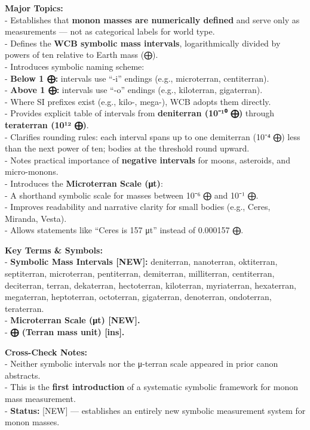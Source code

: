 \documentclass[
  letterpaper,
]{book}
\begin{document}
\textbf{Major Topics:}\\
- Establishes that \textbf{monon masses are numerically defined} and
serve only as measurements --- not as categorical labels for world
type.\\
- Defines the \textbf{WCB symbolic mass intervals}, logarithmically
divided by powers of ten relative to Earth mass (⨁).\\
- Introduces symbolic naming scheme:\\
- \textbf{Below 1 ⨁:} intervals use ``-i'' endings (e.g., microterran,
centiterran).\\
- \textbf{Above 1 ⨁:} intervals use ``-o'' endings (e.g., kiloterran,
gigaterran).\\
- Where SI prefixes exist (e.g., kilo-, mega-), WCB adopts them
directly.\\
- Provides explicit table of intervals from \textbf{deniterran (10⁻¹⁰
⨁)} through \textbf{teraterran (10¹² ⨁)}.\\
- Clarifies rounding rules: each interval spans up to one demiterran
(10⁻⁴ ⨁) less than the next power of ten; bodies at the threshold round
upward.\\
- Notes practical importance of \textbf{negative intervals} for moons,
asteroids, and micro-monons.\\
- Introduces the \textbf{Microterran Scale (μt)}:\\
- A shorthand symbolic scale for masses between 10⁻⁶ ⨁ and 10⁻¹ ⨁.\\
- Improves readability and narrative clarity for small bodies (e.g.,
Ceres, Miranda, Vesta).\\
- Allows statements like ``Ceres is 157 μt'' instead of 0.000157 ⨁.

\textbf{Key Terms \& Symbols:}\\
- \textbf{Symbolic Mass Intervals {[}NEW{]}:} deniterran, nanoterran,
oktiterran, septiterran, microterran, pentiterran, demiterran,
milliterran, centiterran, deciterran, terran, dekaterran, hectoterran,
kiloterran, myriaterran, hexaterran, megaterran, heptoterran,
octoterran, gigaterran, denoterran, ondoterran, teraterran.\\
- \textbf{Microterran Scale (μt) {[}NEW{]}.}\\
- \textbf{⨁ (Terran mass unit) {[}ins{]}.}

\textbf{Cross-Check Notes:}\\
- Neither symbolic intervals nor the μ-terran scale appeared in prior
canon abstracts.\\
- This is the \textbf{first introduction} of a systematic symbolic
framework for monon mass measurement.\\
- \textbf{Status:} {[}NEW{]} --- establishes an entirely new symbolic
measurement system for monon masses.
\end{document}
